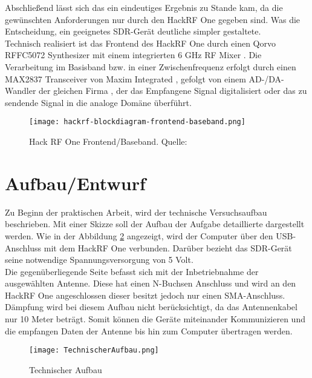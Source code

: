 Abschließend lässt sich das ein eindeutiges Ergebnis zu Stande kam, da die gewünschten Anforderungen nur durch den HackRF One gegeben sind. Was die Entscheidung, ein geeignetes SDR-Gerät deutliche simpler gestaltete.\\

Technisch realisiert ist das Frontend des HackRF One durch einen Qorvo RFFC5072 Synthesizer mit einem integrierten 6 GHz RF Mixer \cite{qorvo}.
Die Verarbeitung im Basisband bzw. in einer Zwischenfrequenz erfolgt durch einen MAX2837 Transceiver von Maxim Integrated \cite{max2837}, gefolgt von einem AD-/DA- Wandler der gleichen Firma \cite{max5864}, der das Empfangene Signal digitalisiert oder das zu sendende Signal in die analoge Domäne überführt.
\begin{figure}[H]
	\centering
	\texttt{[image: hackrf-blockdiagram-frontend-baseband.png]}
	\caption[Hack RF One Frontend/Baseband]{Hack RF One Frontend/Baseband. Quelle: \cite{hackrf-wiki:2016}} 
	\label{HackRFOne-Blockschaltbild}
\end{figure}

\newpage
\section{Aufbau/Entwurf}
Zu Beginn der praktischen Arbeit, wird der technische Versuchsaufbau beschrieben. Mit einer Skizze soll der Aufbau der Aufgabe detaillierte dargestellt werden. Wie in der Abbildung \ref{Technischer Aufbau} angezeigt, wird der Computer über den \ac{USB}-Anschluss mit dem HackRF One verbunden. Darüber bezieht das SDR-Gerät seine notwendige Spannungsversorgung von 5 Volt.\\
Die gegenüberliegende Seite befasst sich mit der Inbetriebnahme der ausgewählten Antenne. Diese hat einen N-Buchsen Anschluss und wird an den HackRF One angeschlossen dieser besitzt jedoch nur einen SMA-Anschluss. Dämpfung wird bei diesem Aufbau nicht berücksichtigt, da das Antennenkabel nur 10 Meter beträgt. Somit können die Geräte miteinander Kommunizieren und die empfangen Daten der Antenne bis hin zum Computer übertragen werden.  
\begin{figure}[H]
	\centering
	\texttt{[image: TechnischerAufbau.png]}
	\caption[Technischer Aufbau]{Technischer Aufbau} 
	\label{Technischer Aufbau}
\end{figure}

\newpage
